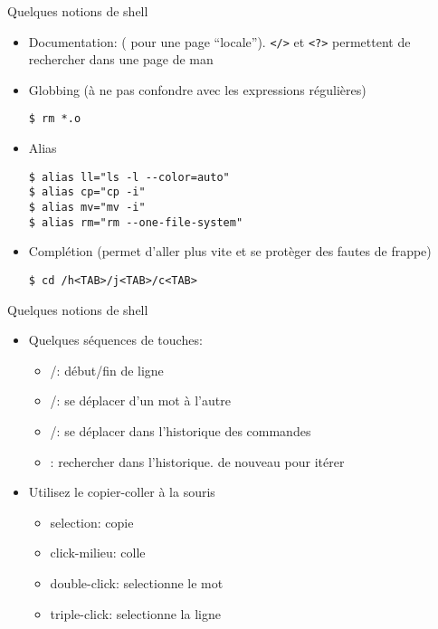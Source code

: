 \begin{frame}[fragile=singleslide]{Quelques notions de shell}
  \begin{itemize}
   \item   Documentation:    (  pour   une  page
     ``locale''). \verb+</>+ et \verb+<?>+ permettent de rechercher dans une page de man
  \item  Globbing   (à  ne   pas  confondre  avec   les  expressions
    régulières)
    \begin{lstlisting}
$ rm *.o
    \end{lstlisting}
  \item Alias
    \begin{lstlisting}
$ alias ll="ls -l --color=auto"
$ alias cp="cp -i"
$ alias mv="mv -i"
$ alias rm="rm --one-file-system"
    \end{lstlisting} %
  \item Complétion (permet d'aller plus vite et se protèger des fautes de frappe)
      \begin{lstlisting}
$ cd /h<TAB>/j<TAB>/c<TAB>
      \end{lstlisting}
  \end{itemize}
\end{frame}

\begin{frame}[fragile=singleslide]{Quelques notions de shell}
  \begin{itemize}
    \item Quelques séquences de touches:
      \begin{itemize}
      \item {}/: début/fin de ligne
      \item {}/: se déplacer d'un mot à l'autre
      \item {}/: se déplacer dans l'historique des commandes
      \item {}: rechercher dans l'historique.  de nouveau pour itérer
      \end{itemize}
    \item Utilisez le copier-coller à la souris
      \begin{itemize}
      \item selection: copie
      \item click-milieu: colle
      \item double-click: selectionne le mot
      \item triple-click: selectionne la ligne
      \end{itemize}
  \end{itemize}
\end{frame}

